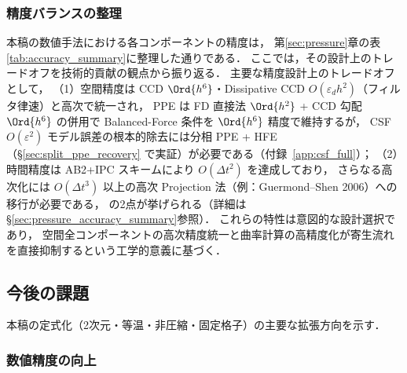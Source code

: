 \subsubsection{精度バランスの整理}

本稿の数値手法における各コンポーネントの精度は，
第\ref{sec:pressure}章の表\ref{tab:accuracy_summary}に整理した通りである．
ここでは，その設計上のトレードオフを技術的貢献の観点から振り返る．
主要な精度設計上のトレードオフとして，
（1）空間精度は CCD $\Ord{h^6}$・Dissipative CCD $O(\varepsilon_d h^2)$（フィルタ律速）と高次で統一され，
PPE は FD 直接法 $\Ord{h^2}$ + CCD 勾配 $\Ord{h^6}$ の併用で
Balanced-Force 条件を $\Ord{h^6}$ 精度で維持するが，
CSF $O(\varepsilon^2)$ モデル誤差の根本的除去には分相 PPE + HFE（§\ref{sec:split_ppe_recovery} で実証）が必要である（付録~\ref{app:csf_full}）；
（2）時間精度は AB2+IPC スキームにより $O(\Delta t^2)$ を達成しており，
さらなる高次化には $O(\Delta t^3)$ 以上の高次 Projection 法（例：Guermond--Shen 2006）への移行が必要である，
の2点が挙げられる（詳細は§\ref{sec:pressure_accuracy_summary}参照）．
これらの特性は意図的な設計選択であり，
空間全コンポーネントの高次精度統一と曲率計算の高精度化が寄生流れを直接抑制するという工学的意義に基づく．

\subsection{今後の課題}
\label{sec:future_work}

本稿の定式化（2次元・等温・非圧縮・固定格子）の主要な拡張方向を示す．

\subsubsection{数値精度の向上}


